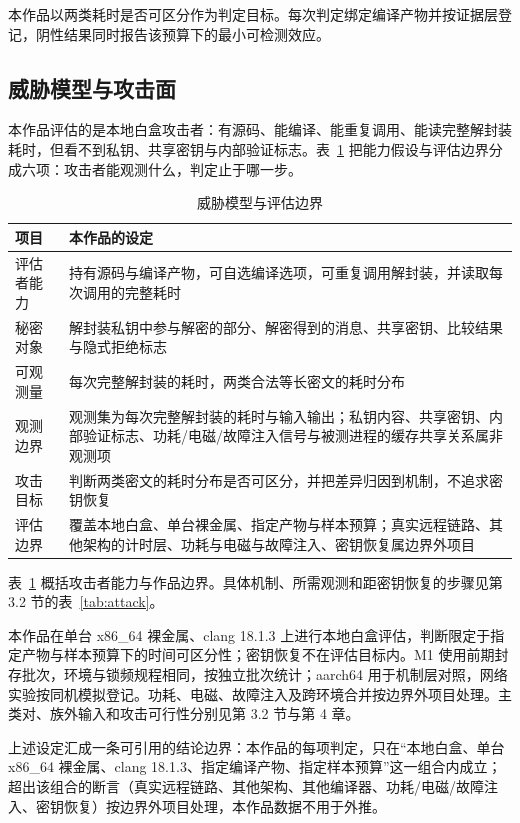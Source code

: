 本作品以两类耗时是否可区分作为判定目标。每次判定绑定编译产物并按证据层登记，阴性结果同时报告该预算下的最小可检测效应。

\subsection{威胁模型与攻击面}

本作品评估的是本地白盒攻击者：有源码、能编译、能重复调用、能读完整解封装耗时，但看不到私钥、共享密钥与内部验证标志。表~\ref{tab:threat} 把能力假设与评估边界分成六项：攻击者能观测什么，判定止于哪一步。

\begin{table}[H]
\centering
\caption{威胁模型与评估边界}
\label{tab:threat}
{\small
\begin{tabularx}{\textwidth}{|>{\raggedright\arraybackslash}p{3.0cm}|>{\raggedright\arraybackslash}X|}
\hline
项目 & 本作品的设定 \\
\hline
评估者能力 & 持有源码与编译产物，可自选编译选项，可重复调用解封装，并读取每次调用的完整耗时 \\
\hline
秘密对象 & 解封装私钥中参与解密的部分、解密得到的消息、共享密钥、比较结果与隐式拒绝标志 \\
\hline
可观测量 & 每次完整解封装的耗时，两类合法等长密文的耗时分布 \\
\hline
观测边界 & 观测集为每次完整解封装的耗时与输入输出；私钥内容、共享密钥、内部验证标志、功耗/电磁/故障注入信号与被测进程的缓存共享关系属非观测项 \\
\hline
攻击目标 & 判断两类密文的耗时分布是否可区分，并把差异归因到机制，不追求密钥恢复 \\
\hline
评估边界 & 覆盖本地白盒、单台裸金属、指定产物与样本预算；真实远程链路、其他架构的计时层、功耗与电磁与故障注入、密钥恢复属边界外项目 \\
\hline
\end{tabularx}
}
\end{table}

表~\ref{tab:threat} 概括攻击者能力与作品边界。具体机制、所需观测和距密钥恢复的步骤见第 3.2 节的表~\ref{tab:attack}。

本作品在单台 x86\_64 裸金属、clang 18.1.3 上进行本地白盒评估，判断限定于指定产物与样本预算下的时间可区分性；密钥恢复不在评估目标内。M1 使用前期封存批次，环境与锁频规程相同，按独立批次统计；aarch64 用于机制层对照，网络实验按同机模拟登记。功耗、电磁、故障注入及跨环境合并按边界外项目处理。主类对、族外输入和攻击可行性分别见第 3.2 节与第 4 章。

上述设定汇成一条可引用的结论边界：本作品的每项判定，只在“本地白盒、单台 x86\_64 裸金属、clang 18.1.3、指定编译产物、指定样本预算”这一组合内成立；超出该组合的断言（真实远程链路、其他架构、其他编译器、功耗/电磁/故障注入、密钥恢复）按边界外项目处理，本作品数据不用于外推。

